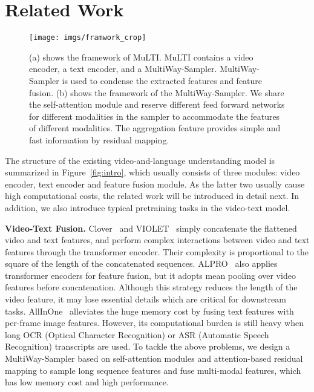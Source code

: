 \documentclass[10pt,twocolumn,letterpaper]{article}
\begin{document}
\section{Related Work}\label{sec:relatedwork}
\vspace{-0.5ex}
\begin{figure*}[ht]
\centering
\texttt{[image: imgs/framwork\_crop]}
\vspace{-1ex}
\caption{
    (a) shows the framework of MuLTI. MuLTI contains a video encoder, a text encoder, and a MultiWay-Sampler. MultiWay-Sampler is used to condense the extracted features and feature fusion. 
    (b) shows the framework of the MultiWay-Sampler. We share the self-attention module and reserve different feed forward networks for different modalities in the sampler to accommodate the features of different modalities. The aggregation feature provides simple and fast information by residual mapping.
}
\vspace{-4ex}
\label{fig:arch}
\end{figure*} The structure of the existing video-and-language understanding model is summarized in Figure~\ref{fig:intro}, which usually consists of three modules: 
video encoder, text encoder and feature fusion module. As the latter two usually cause high computational costs, the related work will be introduced in detail next. In addition, we also introduce typical pretraining tasks in the video-text model.


\textbf{Video-Text Fusion.} Clover~\cite{Huang2022CloverTA} and VIOLET~\cite{Fu2021VIOLETE} simply concatenate the flattened video and text features, and perform complex interactions between video and text features through the transformer encoder. 
Their complexity is proportional to the square of the length of the concatenated sequences. 
ALPRO~\cite{Li2021AlignAP} also applies transformer encoders for feature fusion, but it adopts mean pooling over video features before concatenation. Although this strategy reduces the length of the video feature, it may lose essential details which are critical for downstream tasks. 
AllInOne~\cite{Wang2022AllIO} alleviates the huge memory cost by fusing text features with per-frame image features. However, its computational burden is still heavy when long OCR (Optical Character Recognition) or ASR (Automatic Speech Recognition) transcripts are used. 
To tackle the above problems, we design a MultiWay-Sampler based on self-attention modules and attention-based residual mapping to sample long sequence features and fuse multi-modal features, which has low memory cost and high performance.
\end{document}
